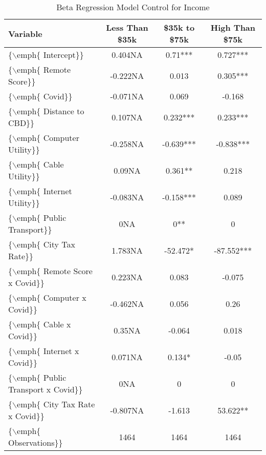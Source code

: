 \begin{table}[ht]
\centering
\begin{tabular}{|l|c|c|c|}
  \hline
Variable & Less Than \$35k & \$35k to \$75k & High Than \$75k \\ 
  \hline
\{$\backslash$emph\{ Intercept\}\} & 0.404NA & 0.71*** & 0.727*** \\ 
  \{$\backslash$emph\{ Remote Score\}\} & -0.222NA & 0.013 & 0.305*** \\ 
  \{$\backslash$emph\{ Covid\}\} & -0.071NA & 0.069 & -0.168 \\ 
  \{$\backslash$emph\{ Distance to CBD\}\} & 0.107NA & 0.232*** & 0.233*** \\ 
  \{$\backslash$emph\{ Computer Utility\}\} & -0.258NA & -0.639*** & -0.838*** \\ 
  \{$\backslash$emph\{ Cable Utility\}\} & 0.09NA & 0.361** & 0.218 \\ 
  \{$\backslash$emph\{ Internet Utility\}\} & -0.083NA & -0.158*** & 0.089 \\ 
  \{$\backslash$emph\{ Public Transport\}\} & 0NA & 0** & 0 \\ 
  \{$\backslash$emph\{ City Tax Rate\}\} & 1.783NA & -52.472* & -87.552*** \\ 
  \{$\backslash$emph\{ Remote Score x Covid\}\} & 0.223NA & 0.083 & -0.075 \\ 
  \{$\backslash$emph\{ Computer x Covid\}\} & -0.462NA & 0.056 & 0.26 \\ 
  \{$\backslash$emph\{ Cable x Covid\}\} & 0.35NA & -0.064 & 0.018 \\ 
  \{$\backslash$emph\{ Internet x Covid\}\} & 0.071NA & 0.134* & -0.05 \\ 
  \{$\backslash$emph\{ Public Transport x Covid\}\} & 0NA & 0 & 0 \\ 
  \{$\backslash$emph\{ City Tax Rate x Covid\}\} & -0.807NA & -1.613 & 53.622** \\ 
  \{$\backslash$emph\{ Observations\}\} & 1464 & 1464 & 1464 \\ 
   \hline
\end{tabular}
\caption{Beta Regression Model Control for Income} 
\end{table}
